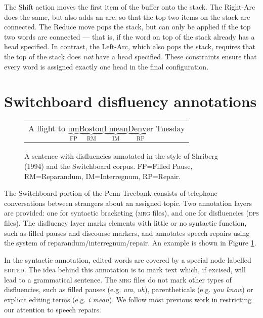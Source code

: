 \documentclass[11pt,letterpaper]{article}
\begin{document}
The Shift action moves the first item of the buffer onto the stack.
The Right-Arc does the same, but also adds an arc, so that the top two items
on the stack are connected. The Reduce move pops the stack, but can only be applied
if the top two words are connected --- that is, if the word on top of the stack
already has a head specified. In contrast, the Left-Arc, which also pops the stack,
requires that the top of the stack does \emph{not} have a head specified. These
constraints ensure that every word is assigned exactly one head in the final
configuration.

\section{Switchboard disfluency annotations}
\label{sec:swbd}

\begin{figure}
    \begin{tabular}{l}

        A flight to $\underbrace{\mathrm{um}}_\text{FP} \underbrace{\mathrm{Boston}}_\text{RM} \underbrace{\mathrm{I\;mean}}_\text{IM} \underbrace{\mathrm{Denver}}_\text{RP}$ Tuesday\\

\end{tabular}
\caption{\small A sentence with disfluencies annotated in the style of Shriberg (1994) 
    and the Switchboard corpus.
FP=Filled Pause, RM=Reparandum, IM=Interregnum, RP=Repair.\label{fig:shriberg}}
\end{figure}
The Switchboard portion of the Penn Treebank \citep{marcus:93} consists of
telephone conversations between strangers about
an assigned topic.  Two annotation layers are provided: one for syntactic
bracketing (\textsc{mrg} files),
and one for disfluencies (\textsc{dps} files).  The disfluency layer marks
elements with little or no syntactic function, such as filled pauses and discourse
markers, and annotates speech repairs using the \citet{shriberg:94} system of
reparandum/interregnum/repair. An example is shown in Figure \ref{fig:shriberg}.

In the syntactic annotation, edited words are covered by a special node labelled
\textsc{edited}.
The idea behind this annotation is to mark text which, if
excised, will lead to a grammatical sentence.  The \textsc{mrg} files do not
mark other types of disfluencies, such as filled pauses (e.g. \emph{um}, \emph{uh}),
parentheticals (e.g. \emph{you know}) or explicit editing terms (e.g. \emph{i mean}).
We follow most previous work in restricting our attention to speech repairs.
\end{document}
